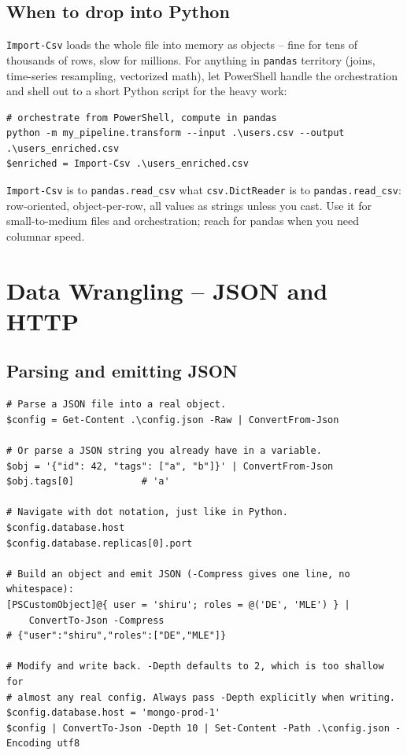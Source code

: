 \documentclass[11pt,a4paper]{article}
\newcommand{\cmd}[1]{\texttt{\textcolor{pwshKw}{#1}}}
\begin{document}
\subsection*{When to drop into Python}

\cmd{Import-Csv} loads the whole file into memory as objects -- fine
for tens of thousands of rows, slow for millions. For anything in
\texttt{pandas} territory (joins, time-series resampling, vectorized
math), let PowerShell handle the orchestration and shell out to a
short Python script for the heavy work:

\begin{lstlisting}[style=pwshstyle]
# orchestrate from PowerShell, compute in pandas
python -m my_pipeline.transform --input .\users.csv --output .\users_enriched.csv
$enriched = Import-Csv .\users_enriched.csv
\end{lstlisting}

\begin{compare}
\cmd{Import-Csv} is to \texttt{pandas.read\_csv} what
\texttt{csv.DictReader} is to \texttt{pandas.read\_csv}: row-oriented,
object-per-row, all values as strings unless you cast. Use it for
small-to-medium files and orchestration; reach for pandas when you
need columnar speed.
\end{compare}

\section{Data Wrangling -- JSON and HTTP}
\label{sec:json}

\subsection*{Parsing and emitting JSON}

\begin{lstlisting}[style=pwshstyle]
# Parse a JSON file into a real object.
$config = Get-Content .\config.json -Raw | ConvertFrom-Json

# Or parse a JSON string you already have in a variable.
$obj = '{"id": 42, "tags": ["a", "b"]}' | ConvertFrom-Json
$obj.tags[0]            # 'a'

# Navigate with dot notation, just like in Python.
$config.database.host
$config.database.replicas[0].port

# Build an object and emit JSON (-Compress gives one line, no whitespace):
[PSCustomObject]@{ user = 'shiru'; roles = @('DE', 'MLE') } |
    ConvertTo-Json -Compress
# {"user":"shiru","roles":["DE","MLE"]}

# Modify and write back. -Depth defaults to 2, which is too shallow for
# almost any real config. Always pass -Depth explicitly when writing.
$config.database.host = 'mongo-prod-1'
$config | ConvertTo-Json -Depth 10 | Set-Content -Path .\config.json -Encoding utf8
\end{lstlisting}
\end{document}
